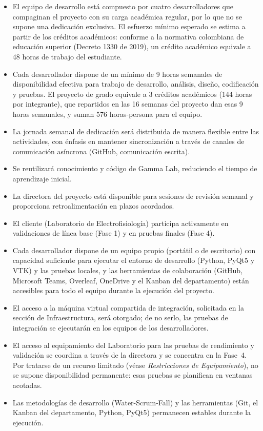 \documentclass{article}
\begin{document}
\begin{itemize}
    \item El equipo de desarrollo está compuesto por cuatro desarrolladores que compaginan el proyecto con su carga académica regular, por lo que no se supone una dedicación exclusiva. El esfuerzo mínimo esperado se estima a partir de los créditos académicos: conforme a la normativa colombiana de educación superior (Decreto 1330 de 2019), un crédito académico equivale a 48 horas de trabajo del estudiante.
    \item Cada desarrollador dispone de un mínimo de 9 horas semanales de disponibilidad efectiva para trabajo de desarrollo, análisis, diseño, codificación y pruebas. El proyecto de grado equivale a 3 créditos académicos (144 horas por integrante), que repartidos en las 16 semanas del proyecto dan esas 9 horas semanales, y suman 576 horas-persona para el equipo.
    \item La jornada semanal de dedicación será distribuida de manera flexible entre las actividades, con énfasis en mantener sincronización a través de canales de comunicación asíncrona (GitHub, comunicación escrita).
    \item Se reutilizará conocimiento y código de Gamma Lab, reduciendo el tiempo de aprendizaje inicial.
    \item La directora del proyecto está disponible para sesiones de revisión semanal y proporciona retroalimentación en plazos acordados.
    \item El cliente (Laboratorio de Electrofisiología) participa activamente en validaciones de línea base (Fase 1) y en pruebas finales (Fase 4).
    \item Cada desarrollador dispone de un equipo propio (portátil o de escritorio) con capacidad suficiente para ejecutar el entorno de desarrollo (Python, PyQt5 y VTK) y las pruebas locales, y las herramientas de colaboración (GitHub, Microsoft Teams, Overleaf, OneDrive y el Kanban del departamento) están accesibles para todo el equipo durante la ejecución del proyecto.
    \item El acceso a la máquina virtual compartida de integración, solicitada en la sección de Infraestructura, será otorgado; de no serlo, las pruebas de integración se ejecutarán en los equipos de los desarrolladores.
    \item El acceso al equipamiento del Laboratorio para las pruebas de rendimiento y validación se coordina a través de la directora y se concentra en la Fase~4. Por tratarse de un recurso limitado (véase \textit{Restricciones de Equipamiento}), no se supone disponibilidad permanente: esas pruebas se planifican en ventanas acotadas.
    \item Las metodologías de desarrollo (Water-Scrum-Fall) y las herramientas (Git, el Kanban del departamento, Python, PyQt5) permanecen estables durante la ejecución.
\end{itemize}
\end{document}

